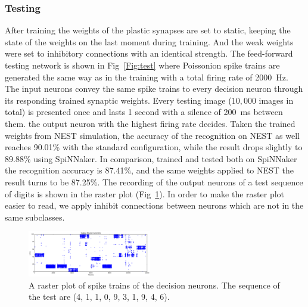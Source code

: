 \subsubsection{Testing}
After training the weights of the plastic synapses are set to static, keeping the state of the weights on the last moment during training.
And the weak weights were set to inhibitory connections with an identical strength.
The feed-forward testing network is shown in Fig~\ref{Fig:test} where Poissonion spike trains are generated the same way as in the training with a total firing rate of 2000~Hz.
The input neurons convey the same spike trains to every decision neuron through its responding trained synaptic weights. 
Every testing image ($10,000$ images in total) is presented once and lasts 1 second with a silence of 200~ms between them.
the output neuron with the highest firing rate decides.
Taken the trained weights from NEST simulation, the accuracy of the recognition on NEST as well reaches 90.01\% with the standard configuration, while the result drops slightly to 89.88\% using SpiNNaker.
In comparison, trained and tested both on SpiNNaker the recognition accuracy is 87.41\%, and the same weights applied to NEST the result turns to be 87.25\%. 
The recording of the output neurons of a test sequence of digits is shown in the raster plot (Fig~\ref{Fig:output}).
In order to make the raster plot easier to read, we apply inhibit connections between neurons which are not in the same subclasses.


\begin{figure}[hbt!]
	\centering
	\includegraphics[width=0.48\textwidth]{images/test300-301.pdf}
	\caption{A raster plot of spike trains of the decision neurons. The sequence of the test are (4, 1, 1, 0, 9, 3, 1, 9, 4, 6).}
	\label{Fig:output}
\end{figure} 
